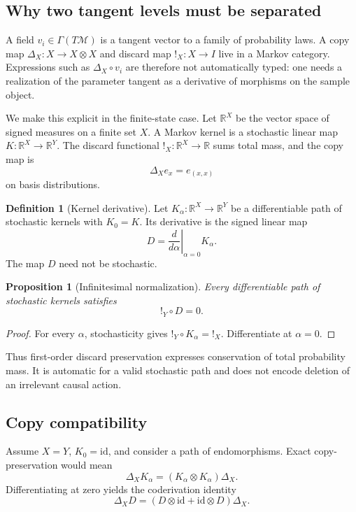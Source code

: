 \documentclass{article}
\theoremstyle{plain}
\newtheorem{proposition}[theorem]{Proposition}
\theoremstyle{definition}
\newtheorem{definition}[theorem]{Definition}
\theoremstyle{remark}
\newcommand{\R}{\mathbb R}
\newcommand{\M}{\mathcal M}
\newcommand{\id}{\mathrm{id}}
\begin{document}
\subsection{Why two tangent levels must be separated}

A field \(v_i\in\Gamma(T\M)\) is a tangent vector to a family of probability
laws.  A copy map \(\Delta_X:X\to X\otimes X\) and discard map
\(!_{X}:X\to I\) live in a Markov category.  Expressions such as
\(\Delta_X\circ v_i\) are therefore not automatically typed: one needs a
realization of the parameter tangent as a derivative of morphisms on the sample
object.

We make this explicit in the finite-state case.  Let \(\R^X\) be the vector
space of signed measures on a finite set \(X\).  A Markov kernel is a stochastic
linear map \(K:\R^X\to\R^Y\).  The discard functional
\(!_{X}:\R^X\to\R\) sums total mass, and the copy map is
\[
  \Delta_X e_x=e_{(x,x)}
\]
on basis distributions.

\begin{definition}[Kernel derivative]
Let \(K_\alpha:\R^X\to\R^Y\) be a differentiable path of stochastic kernels
with \(K_0=K\).  Its derivative is the signed linear map
\[
  D=\left.\frac{d}{d\alpha}\right|_{\alpha=0}K_\alpha .
\]
The map \(D\) need not be stochastic.
\end{definition}

\begin{proposition}[Infinitesimal normalization]
\label{prop:normalization}
Every differentiable path of stochastic kernels satisfies
\[
  !_{Y}\circ D=0 .
\]
\end{proposition}

\begin{proof}
For every \(\alpha\), stochasticity gives
\(!_{Y}\circ K_\alpha=!_{X}\).  Differentiate at \(\alpha=0\).
\end{proof}

Thus first-order discard preservation expresses conservation of total
probability mass.  It is automatic for a valid stochastic path and does not
encode deletion of an irrelevant causal action.

\subsection{Copy compatibility}

Assume \(X=Y\), \(K_0=\id\), and consider a path of endomorphisms.  Exact
copy-preservation would mean
\[
  \Delta_XK_\alpha
  =
  (K_\alpha\otimes K_\alpha)\Delta_X .
\]
Differentiating at zero yields the coderivation identity
\[
  \Delta_XD
  =
  (D\otimes\id+\id\otimes D)\Delta_X .
\]
\end{document}
